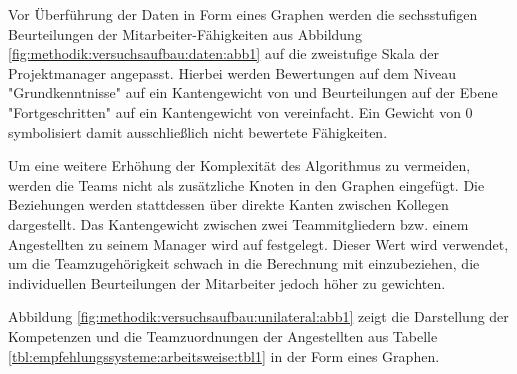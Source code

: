 Vor Überführung der Daten in Form eines Graphen werden die sechsstufigen Beurteilungen der Mitarbeiter-Fähigkeiten aus Abbildung \ref{fig:methodik:versuchsaufbau:daten:abb1} auf die zweistufige Skala der Projektmanager angepasst. Hierbei werden Bewertungen auf dem Niveau "Grundkenntnisse" auf ein Kantengewicht von \kantengewichtString und Beurteilungen auf der Ebene "Fortgeschritten" auf ein Kantengewicht von \kantengewichtHochString vereinfacht. Ein Gewicht von 0 symbolisiert damit ausschließlich nicht bewertete Fähigkeiten.

Um eine weitere Erhöhung der Komplexität des Algorithmus zu vermeiden, werden die Teams nicht als zusätzliche Knoten in den Graphen eingefügt. Die Beziehungen werden stattdessen über direkte Kanten zwischen Kollegen dargestellt. Das Kantengewicht zwischen zwei Teammitgliedern bzw. einem Angestellten zu seinem Manager wird auf \teamgewichtString festgelegt. Dieser Wert wird verwendet, um die Teamzugehörigkeit schwach in die Berechnung mit einzubeziehen, die individuellen Beurteilungen der Mitarbeiter jedoch höher zu gewichten.%

Abbildung \ref{fig:methodik:versuchsaufbau:unilateral:abb1} zeigt die Darstellung der Kompetenzen und die Teamzuordnungen der Angestellten aus Tabelle \ref{tbl:empfehlungssysteme:arbeitsweise:tbl1} in der Form eines Graphen.%

